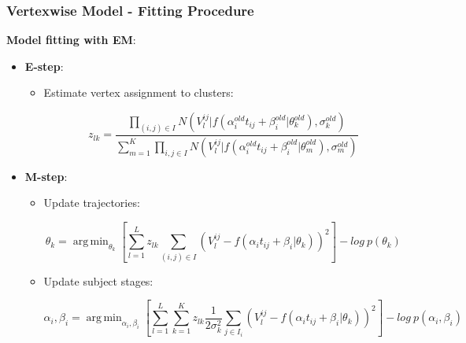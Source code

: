 \documentclass[10pt,xcolor=table]{beamer}
\DeclareMathOperator*{\argmin}{arg\,min}
\begin{document}
\begin{frame}
\frametitle{Vertexwise Model - Fitting Procedure}

\newcommand{\lw}{0.5mm}

\newcommand{\outFolder}{.}
     
    \vspace{1em} 
    \textbf{Model fitting with EM}:
    \vspace{1em}
    \begin{itemize}
    \item \textbf{E-step}:
    \begin{itemize}
     \item Estimate vertex assignment to clusters:
     
     \begin{equation}
 z_{lk} =  \frac{\prod_{(i,j) \in I} N(V_l^{ij} | f(\alpha_i^{old} t_{ij} + \beta_i^{old} | \theta_k^{old}), \sigma_k^{old})}{\sum_{m=1}^K \prod_{i,j \in I} N(V_l^{ij} | f(\alpha_i^{old} t_{ij} + \beta_i^{old} | \theta_m^{old}), \sigma_m^{old})}
\end{equation}

    \end{itemize}
    \item \textbf{M-step}:
    \begin{itemize}
     \item Update trajectories:
     
     \begin{equation}
 \label{eq:theta}
 \theta_k = \argmin_{\theta_k} \left[\sum_{l=1}^L z_{lk} \sum_{(i,j) \in I} (V_l^{ij} - f(\alpha_i t_{ij} + \beta_i | \theta_k))^2 \right] - log\ p(\theta_k) 
\end{equation}
     
     \item Update subject stages:
     
     \begin{equation}
\label{eq:alpha}
 \alpha_i, \beta_i = \argmin_{\alpha_i, \beta_i}  \left[ \sum_{l=1}^L \sum_{k=1}^K z_{lk} \frac{1}{2\sigma_k^2} \sum_{j \in I_i} (V_l^{ij} - f(\alpha_i t_{ij} + \beta_i | \theta_k))^2\right] - log\ p(\alpha_i, \beta_i)
\end{equation}
     
    \end{itemize}
    \end{itemize}


\end{frame}
\end{document}
